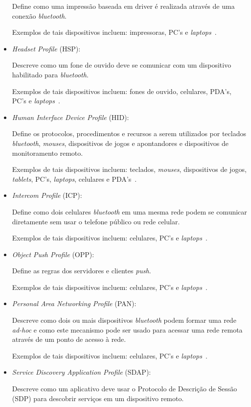 \begin{itemize}
	Define como uma impressão baseada em driver é realizada através de uma conexão \emph{bluetooth}.

	Exemplos de tais dispositivos incluem: impressoras, PC's e \emph{laptops}~\cite{bluetoothprofilesHCRP}.
	\item \emph{Headset Profile} (HSP): 

	Descreve como um fone de ouvido deve se comunicar com um dispositivo habilitado para \emph{bluetooth}.

	Exemplos de tais dispositivos incluem: fones de ouvido, celulares, PDA's, PC's e \emph{laptops}~\cite{bluetoothprofilesHSP}.
	\item \emph{Human Interface Device Profile} (HID): 

	Define os protocolos, procedimentos e recursos a serem utilizados por teclados \emph{bluetooth}, \emph{mouses}, dispositivos de jogos e apontandores e dispositivos de monitoramento remoto.

	Exemplos de tais dispositivos incluem: teclados, \emph{mouses}, dispositivos de jogos, \emph{tablets}, PC's, \emph{laptops}, celulares e PDA's~\cite{bluetoothprofilesHID}.
	\item \emph{Intercom Profile} (ICP): 

	Define como dois celulares \emph{bluetooth} em uma mesma rede podem se comunicar diretamente sem usar o telefone público ou rede celular.

	Exemplos de tais dispositivos incluem: celulares, PC's e \emph{laptops}~\cite{bluetoothprofilesICP}.
	\item \emph{Object Push Profile} (OPP): 

	Define as regras dos servidores e clientes \emph{push}.

	Exemplos de tais dispositivos incluem: celulares, PC's e \emph{laptops}~\cite{bluetoothprofilesOPP}.
	\item \emph{Personal Area Networking Profile} (PAN): 

	Descreve como dois ou mais dispositivos \emph{bluetooth} podem formar uma rede \emph{ad-hoc} e como este mecanismo pode ser usado para acessar uma rede remota através de um ponto de acesso à rede.

	Exemplos de tais dispositivos incluem: celulares, PC's e \emph{laptops}~\cite{bluetoothprofilesPAN}.
	\item \emph{Service Discovery Application Profile} (SDAP): 

	Descreve como um aplicativo deve usar o Protocolo de Descrição de Sessão (SDP) para descobrir serviços em um dispositivo remoto.


\end{itemize}
